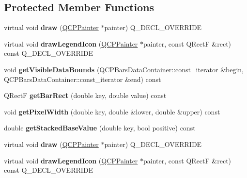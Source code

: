 \subsection*{Protected Member Functions}
\begin{DoxyCompactItemize}
\item 
\mbox{\label{class_q_c_p_bars_aa267c20650d55084c3f47cb2f8fac9dc}} 
virtual void {\bfseries draw} (\hyperlink{class_q_c_p_painter}{Q\+C\+P\+Painter} $\ast$painter) Q\+\_\+\+D\+E\+C\+L\+\_\+\+O\+V\+E\+R\+R\+I\+DE
\item 
\mbox{\label{class_q_c_p_bars_aee7c3e1763fd6b504c45baa8775be7b7}} 
virtual void {\bfseries draw\+Legend\+Icon} (\hyperlink{class_q_c_p_painter}{Q\+C\+P\+Painter} $\ast$painter, const Q\+RectF \&rect) const Q\+\_\+\+D\+E\+C\+L\+\_\+\+O\+V\+E\+R\+R\+I\+DE
\item 
\mbox{\label{class_q_c_p_bars_ac8b6b514a665a7bff4fb080413ba996a}} 
void {\bfseries get\+Visible\+Data\+Bounds} (Q\+C\+P\+Bars\+Data\+Container\+::const\+\_\+iterator \&begin, Q\+C\+P\+Bars\+Data\+Container\+::const\+\_\+iterator \&end) const
\item 
\mbox{\label{class_q_c_p_bars_a01b87e38e5d5089d214646d2af7896ea}} 
Q\+RectF {\bfseries get\+Bar\+Rect} (double key, double value) const
\item 
\mbox{\label{class_q_c_p_bars_ad87586cc5e9806740bc0e867667da409}} 
void {\bfseries get\+Pixel\+Width} (double key, double \&lower, double \&upper) const
\item 
\mbox{\label{class_q_c_p_bars_a0ffd6e043876e13e89eaa54e9f8a04b9}} 
double {\bfseries get\+Stacked\+Base\+Value} (double key, bool positive) const
\item 
\mbox{\label{class_q_c_p_bars_a532b0ee9b17ddc76ef089bae8c37eee7}} 
virtual void {\bfseries draw} (\hyperlink{class_q_c_p_painter}{Q\+C\+P\+Painter} $\ast$painter) Q\+\_\+\+D\+E\+C\+L\+\_\+\+O\+V\+E\+R\+R\+I\+DE
\item 
\mbox{\label{class_q_c_p_bars_ae1da52b19e47f95ed34d00e454a12ba9}} 
virtual void {\bfseries draw\+Legend\+Icon} (\hyperlink{class_q_c_p_painter}{Q\+C\+P\+Painter} $\ast$painter, const Q\+RectF \&rect) const Q\+\_\+\+D\+E\+C\+L\+\_\+\+O\+V\+E\+R\+R\+I\+DE

\end{DoxyCompactItemize}

